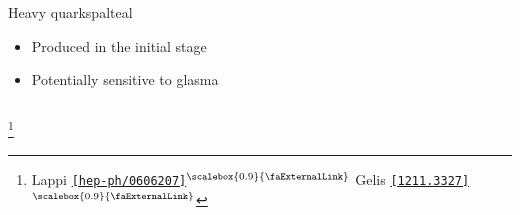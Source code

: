 \documentclass[aspectratio=169,11pt,usenames,dvipsnames]{beamer}
\renewcommand{\thefootnote}{}
\newcommand\blfootnote[1]{%
  \begingroup
  \renewcommand\thefootnote{}\footnote{#1}%
  \addtocounter{footnote}{-1}%
  \endgroup
}
\begin{document}
\begin{frame}[noframenumbering]
\begin{columns}[onlytextwidth,t]
\begin{center}
            \begin{custombox2}{Heavy quarks}{palteal}
                \small
                \begin{varwidth}{0.8\textwidth}
                \begin{itemize}\itemsep0em 
                    \item Produced in the initial stage
                    \item Potentially sensitive to glasma
                \end{itemize}
                \end{varwidth}
            \end{custombox2}
            \end{center}
    \end{columns}
    \vspace{-5pt}
    \blfootnote{\scriptsize Lappi \href{https://arxiv.org/abs/hep-ph/0606207}{{\color{palviolet}\texttt{[hep-ph/0606207]}$^\text{\scalebox{0.9}{\faExternalLink}}$}} Gelis \href{https://arxiv.org/abs/1211.3327}{{\color{palviolet}\texttt{[1211.3327]}$^\text{\scalebox{0.9}{\faExternalLink}}$}}}

\end{frame}
\end{document}
